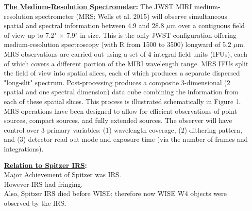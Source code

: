 \smallskip
\smallskip
\noindent
{\bf \underline{The Medium-Resolution Spectrometer}:}
The JWST MIRI medium-resolution spectrometer (MRS; Wells et al. 2015) will observe simultaneous spatial and spectral information between 4.9 and 28.8 $\mu$m over a contiguous field of view up to 7.2" × 7.9" in size. This is the only JWST configuration offering medium-resolution spectroscopy (with R from 1500 to 3500) longward of 5.2 $\mu$m.  \\

\noindent
MRS observations are carried out using a set of 4 integral field units (IFUs), each of which covers a different portion of the MIRI wavelength range. MRS IFUs split the field of view into spatial slices, each of which produces a separate dispersed "long-slit" spectrum. Post-processing produces a composite 3-dimensional (2 spatial and one spectral dimension) data cube combining the information from each of these spatial slices. This process is illustrated schematically in Figure 1.
MRS operations have been designed to allow for efficient observations of point sources, compact sources, and fully extended sources. The observer will have control over 3 primary variables: (1) wavelength coverage, (2) dithering pattern, and (3) detector read out mode and exposure time (via the number of frames and integrations).

\medskip
\medskip
\smallskip
\smallskip
\noindent
{\bf \underline{Relation to Spitzer IRS}:}\\
Major Achievement of Spitzer was IRS. \\
However IRS had fringing. \\
Also, Spitzer IRS died before WISE; therefore now WISE W4 objects were observed by the IRS.\\


